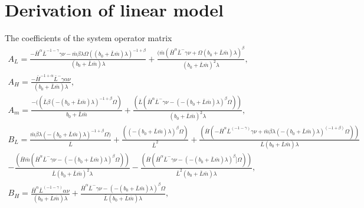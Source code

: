 \documentclass[tc, manuscript]{copernicus}
\begin{document}






\appendix
\section{Derivation of linear model}    %

The coefficients of the system operator matrix
\begin{multline*}
    A_L = \frac{-\bar{H}^\alpha \bar{L}^{-1 - \gamma} \gamma \nu - \bar{m} \beta \lambda \Omega((b_0 + \bar{L} \bar{m}) \lambda)^{-1 + \beta}}{(b_0 +\bar{L} \bar{m}) \lambda} + \frac{(\bar{m} (\bar{H}^\alpha \bar{L}^-\gamma \nu + \Omega(b_0 + \bar{L} \bar{m}) \lambda)^\beta}{(b_0+ \bar{L} \bar{m})^2 \lambda}, \\
    A_H =  \frac{- \bar{H}^{-1 + \alpha} \bar{L}^-\gamma \alpha \nu}{(b_0 + \bar{L} \bar{m}) \lambda}, \\
    A_m =  \frac{-((\bar{L} \beta (-(b_0 + \bar{L} \bar{m}) \lambda)^{-1 + \beta} \Omega)}{b_0 + \bar{L} \bar{m}} + \frac{(\bar{L} (\bar{H}^\alpha \bar{L}^-\gamma \nu - (-(b_0 + \bar{L} \bar{m}) \lambda)^\beta \Omega))}{(b_0 + \bar{L} \bar{m})^2 \lambda}, \\
    B_L = \frac{\bar{m} \beta \lambda (-(b_0 + \bar{L} \bar{m}) \lambda)^{-1 + \beta} \Omega)}{\bar{L}} + \frac{((-(b_0 + \bar{L} \bar{m}) \lambda)^\beta \Omega)}{\bar{L}^2} + \frac{(\bar{H} (-\bar{H}^\alpha \bar{L}^(-1 - \gamma) \gamma \nu + \bar{m} \beta \lambda (-(b_0 + \bar{L} \bar{m}) \lambda)^(-1 + \beta) \Omega))}{\bar{L} (b_0 + \bar{L} \bar{m}) \lambda} \\
    - \frac{(\bar{H} \bar{m} (\bar{H}^\alpha \bar{L}^-\gamma \nu - (-(b_0 + \bar{L} \bar{m}) \lambda)^\beta \Omega))}{\bar{L} (b_0 + \bar{L} \bar{m})^2 \lambda} - \frac{(\bar{H} (\bar{H}^\alpha \bar{L}^-\gamma \nu - (-(b_0 + \bar{L} \bar{m}) \lambda)^\beta] \Omega))}{\bar{L}^2 (b_0 + \bar{L} \bar{m}) \lambda}, \\
    B_H = \frac{\bar{H}^\alpha \bar{L}^(-1 - \gamma) \alpha \nu}{(b_0 + \bar{L} \bar{m}) \lambda} + \frac{\bar{H}^\alpha \bar{L}^-\gamma \nu - (-(b_0 + \bar{L} \bar{m}) \lambda)^\beta \Omega}{\bar{L} (b_0 +\bar{ L} \bar{m}) \lambda}, \\

\end{multline*}
\end{document}
